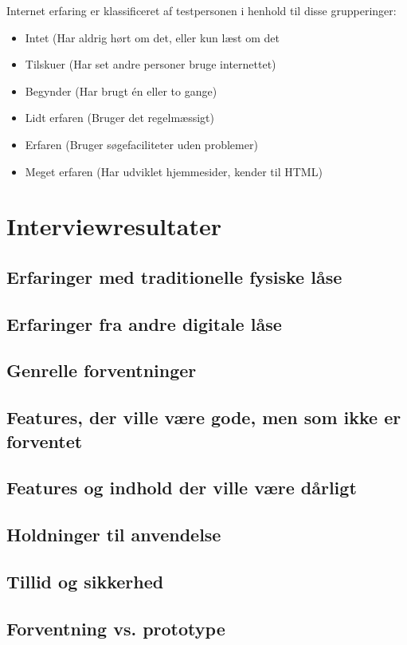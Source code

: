 \documentclass[a4paper,12pt]{article}
\begin{document}
Internet erfaring er klassificeret af testpersonen i henhold til disse grupperinger:
\begin{itemize}


\item Intet (Har aldrig hørt om det, eller kun læst om det 
\item Tilskuer (Har set andre personer bruge internettet)  
\item Begynder (Har brugt én eller to gange)
\item Lidt erfaren (Bruger det regelmæssigt)
\item Erfaren (Bruger søgefaciliteter uden problemer)
\item Meget erfaren (Har udviklet hjemmesider, kender til HTML)

\end{itemize}

\section{Interviewresultater}
\subsection{Erfaringer med traditionelle fysiske låse}
\subsection{Erfaringer fra andre digitale låse}
\subsection{Genrelle forventninger}
\subsection{Features, der ville være gode, men som ikke er forventet}
\subsection{Features og indhold der ville være dårligt}
\subsection{Holdninger til anvendelse}
\subsection{Tillid og sikkerhed}
\subsection{Forventning vs. prototype}
\newpage 
\end{document}
